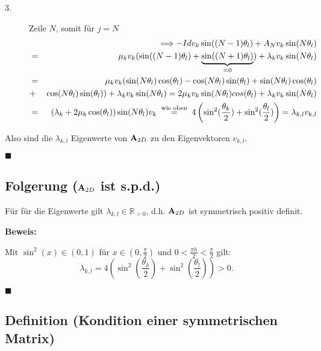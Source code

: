 \begin{description}
\item[3.] Zeile $N$, somit für $j = N$
\begin{eqnarray}
&&\Longrightarrow -Id v_{k} \sin((N-1)\theta_{l}) + A_{N} v_{k} \sin(N \theta_{l}) \notag \\
&=& \mu_{k} v_{k} (\sin((N-1)\theta_{l}) + \underbrace{\sin((N+1)\theta_{l})}_{= 0}) + \lambda_{k} v_{k} \sin(N\theta_{l}) \notag \\
&=& \mu_{k} v_{k} (\sin(N\theta_{l})\cos(\theta_{l}) - \cos(N\theta_{l})\sin(\theta_{l}) + \sin(N\theta_{l})\cos(\theta_{l}) \notag \\
&+& \cos(N\theta_{l})\sin(\theta_{l})) + \lambda_{k} v_{k} \sin(N \theta_{l}) = 2\mu_{k} v_{k} \sin(N\theta_{l})cos(\theta_{l}) + \lambda_{k} v_{k} \sin(N\theta_{l}) \notag \\
&=& (\lambda_{k} + 2\mu_{k}\cos(\theta_{l})) \sin(N\theta_{l}) v_{k} \overset{\textnormal{ wie oben }}{=} 4 \left(\sin^{2}(\frac {\theta_{k}} {2}) + \sin^{2}(\frac {\theta_{l}} {2})\right) = \lambda_{k,l} v_{k,l} \notag
\end{eqnarray}
\end{description}
Also sind die $\lambda_{k,l}$ Eigenwerte von ${\textbf{A}}_{2D}$ zu den Eigenvektoren $v_{k,l}$.
\begin{flushright}
$\blacksquare$
\end{flushright}

\subsection{Folgerung (${\textbf{A}}_{2D}$ ist s.p.d.)}

Für für die Eigenwerte gilt $\lambda_{k,l} \in \mathbb{R}_{> 0}$, d.h. ${\textbf{A}}_{2D}$ ist symmetrisch positiv definit.

\textbf{Beweis:}

Mit $\sin^{2}(x) \in (0,1)$ für $x \in (0,\frac{\pi}{2})$ und $0 < \frac{\pi h}{2} < \frac{\pi}{2}$ gilt:
\begin{equation}
\lambda_{k,l} = 4 \left(\sin^{2}(\frac {\theta_{k}} {2}) + \sin^{2}(\frac {\theta_{l}} {2})\right) > 0.
\end{equation}
\begin{flushright}
$\blacksquare$
\end{flushright}

\subsection{Definition (Kondition einer symmetrischen Matrix)}\label{ss.Definition Kondition einer Matrix}

